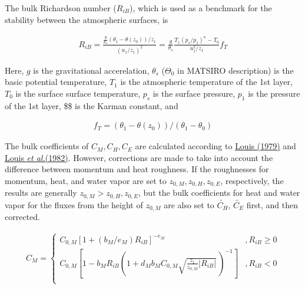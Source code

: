 The bulk Richardson number (\(R_{iB}\)), which is used as a benchmark
for the stability between the atmospheric surfaces, is

\begin{eqnarray}
R_{iB} =
            \frac{ \frac{g}{\theta_s} (\theta_1 - \theta(z_0))/z_1 }
              { (u_1/z_1)^2                                  }
       = \frac{g}{\theta_s}
         \frac{T_1 (p_s/p_1)^\kappa - T_0 }{u_1^2/z_1} f_T
\end{eqnarray}

Here, \(g\) is the gravitational accerelation, \(\theta_s\)
(\(\Theta_0\) in MATSIRO description) is the basic potential
temperature, \(T_1\) is the atmospheric temperature of the 1st layer,
\(T_0\) is the surface surface temperature, \(p_s\) is the surface
pressure, \(p_1\) is the pressure of the 1st layer, \$\kappa \$ is the
Karman constant, and

\begin{eqnarray}
f_T = (\theta_1 - \theta(z_0))/(\theta_1 - \theta_0)
\end{eqnarray}

The bulk coefficients of \(C_M,C_H,C_E\) are calculated according to
\href{./papers/Louis1979_Article_AParametricModelOfVerticalEddy.pdf}{Louis
(1979)} and
\href{./papers/Louis1982_a_short_history_of_the_operational_pbl_parameterization_at_ecmwf.pdf}{Louis
{\emph{et al.}}(1982)}. However, corrections are made to take into
account the difference between momentum and heat roughness. If the
roughnesses for momentum, heat, and water vapor are set to
\(z_{0,M}, z_{0,H}, z_{0,E}\), respectively, the results are generally
\(z_{0,M} > z_{0,H}, z_{0,E}\), but the bulk coefficients for heat and
water vapor for the fluxes from the height of \(z_{0,M}\) are also set
to \(\widetilde{C_H}\), \(\widetilde{C_E}\) first, and then corrected.

\begin{eqnarray}
    C_M = \left\{
      \begin{array}{lr}
      C_{0,M} [ 1 + (b_M/e_M)  R_{iB} ]^{-e_M}
            &,
          R_{iB} \geq 0 \\
      C_{0,M} \left[ 1 - b_M R_{iB} \left( 1+ d_M b_M C_{0,M}
                                  \sqrt{\frac{z_1}{z_{0,M}}| R_{iB}|} \,
                                  \right)^{-1} \right]     
          &,
          R_{iB} < 0 \\
      \end{array} \right.
\end{eqnarray}

